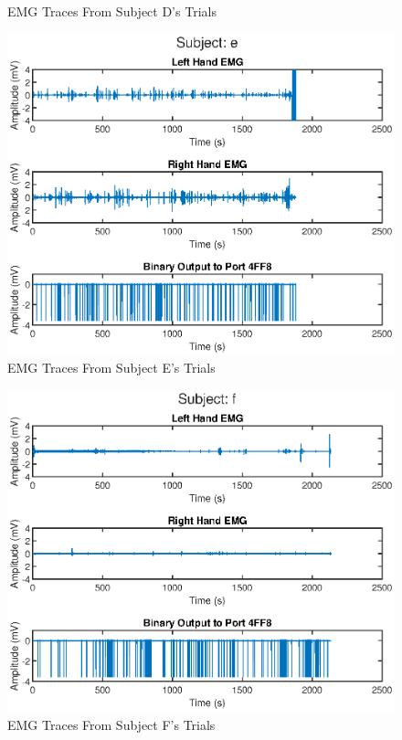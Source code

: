 \begin{appendices}
\begin{figure}[H]
    \caption{EMG Traces From Subject D's Trials}
    \label{fig:EMG_Sum_D}
\end{figure}
\begin{figure}[H]
    \centering
    \includegraphics[width=0.75\linewidth]{figures/EMG_summary_e.eps}
    \caption{EMG Traces From Subject E's Trials}
    \label{fig:EMG_Sum_E}
\end{figure}
\begin{figure}[H]
    \centering
    \includegraphics[width=0.75\linewidth]{figures/EMG_summary_f.eps}
    \caption{EMG Traces From Subject F's Trials}
    \label{fig:EMG_Sum_F}
\end{figure}


\end{appendices}
